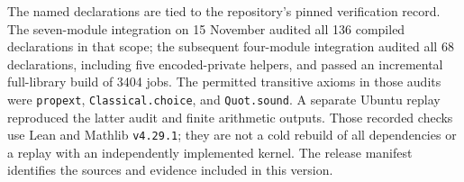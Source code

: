 The named declarations are tied to the repository's pinned verification
record. The seven-module integration on 15 November audited all 136
compiled declarations in that scope; the subsequent four-module
integration audited all 68 declarations, including five encoded-private
helpers, and passed an incremental full-library build of 3404 jobs.
The permitted transitive axioms in those audits were
\texttt{propext}, \texttt{Classical.choice}, and \texttt{Quot.sound}.
A separate Ubuntu replay reproduced the latter audit and finite
arithmetic outputs. Those recorded checks use Lean and Mathlib
\texttt{v4.29.1}; they are not a cold rebuild of all dependencies or a
replay with an independently implemented kernel. The release manifest
identifies the sources and evidence included in this version.
